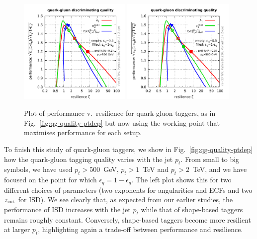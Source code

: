 \begin{figure}[t!]
  \includegraphics[width=0.48\textwidth,page=7]{figures/qg-performance.pdf}%
  \hfill%
  \includegraphics[width=0.48\textwidth,page=6]{figures/qg-performance.pdf}%
  \caption{Plot of performance v.\ resilience for quark-gluon taggers,
    as in Fig.~\ref{fig:qg-quality-ptdep} but now using the working
    point that maximises performance for each
    setup.}\label{fig:qg-quality-ptdep-best-perf}
\end{figure}

To finish this study of quark-gluon taggers, we show in
Fig.~\ref{fig:qg-quality-ptdep} how the quark-gluon tagging quality
varies with the jet $p_t$. From small to big symbols, we have used
$p_t>500$~GeV, $p_t>1$~TeV and $p_t>2$~TeV, and we have focused on the
point for which $\epsilon_q=1-\epsilon_g$.
%
The left plot shows this for two different choices of parameters (two
exponents for angularities and ECFs and two $z_{\text{cut}}$ for ISD).
%
We see clearly that, as expected from our earlier studies, the
performance of ISD increases with the jet $p_t$ while that of
shape-based taggers remains roughly constant. Conversely, shape-based
taggers become more resilient at larger $p_t$, highlighting again a
trade-off between performance and resilience.

